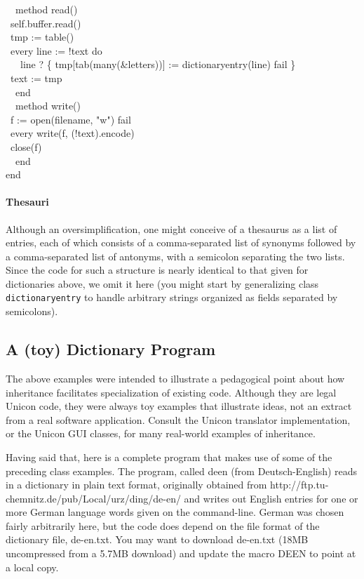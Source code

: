 {\ \ method read() \\
\>   \ self.buffer.read() \\
\>   \ tmp := table() \\
\>   \ every line := !text do \\
\>   \ \ \ line ? \{ tmp[tab(many(\&letters))] := dictionaryentry(line)
{\textbar} fail \} \\
\>   \ text := tmp \\
\ \ end \\
\ \ method write() \\
\>   \ f := open(filename, "w") {\textbar}
fail \\
\>   \ every write(f, (!text).encode) \\
\>   \ close(f) \\
\ \ end \\
end
}

\paragraph{Thesauri}
Although an oversimplification, one might conceive of a thesaurus as a
list of entries, each of which consists of a comma-separated list of
synonyms followed by a comma-separated list of antonyms, with a
semicolon separating the two lists. Since the code for such a structure
is nearly identical to that given for dictionaries above, we omit it
here (you might start by generalizing class \texttt{dictionaryentry} to
handle arbitrary strings organized as fields separated by semicolons). 


\subsection*{A (toy) Dictionary Program}

The above examples were intended to illustrate a pedagogical point
about how inheritance facilitates specialization of existing code.
Although they are legal Unicon code, they were always toy examples
that illustrate ideas, not an extract from a real software
application.  Consult the Unicon translator implementation, or
the Unicon GUI classes, for many real-world examples of inheritance.

Having said that, here is a complete program that makes use of some
of the preceding class examples.  The program, called deen (from
Deutsch-English) reads in a dictionary in plain text format,
originally obtained from
http://ftp.tu-chemnitz.de/pub/Local/urz/ding/de-en/
and writes out English entries for one or more German language words
given on the command-line. German was chosen fairly arbitrarily here,
but the code does depend on the file format of the dictionary file,
de-en.txt. You may want to download de-en.txt (18MB uncompressed from
a 5.7MB download) and update the macro DEEN to point at a local copy.




